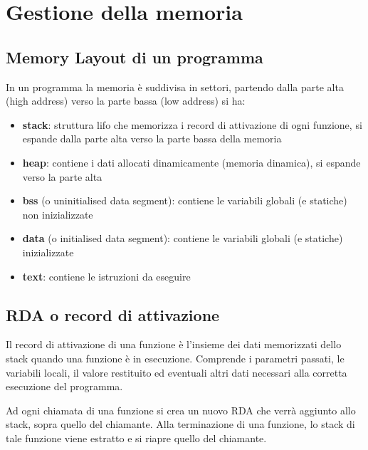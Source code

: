 \documentclass[a4paper]{article}
\begin{document}
\newpage

\section{Gestione della memoria}
\subsection{Memory Layout di un programma}
In un programma la memoria è suddivisa in settori, partendo dalla parte alta (high address) verso la parte bassa (low address) si ha:
\begin{itemize}
	\item \textbf{stack}: struttura lifo che memorizza i record di attivazione di ogni funzione, si espande dalla parte alta
	verso la parte bassa della memoria
	\item \textbf{heap}: contiene i dati allocati dinamicamente (memoria dinamica), si espande verso la parte alta
	\item \textbf{bss} (o uninitialised data segment): contiene le variabili globali (e statiche) non inizializzate
	\item \textbf{data} (o initialised data segment): contiene le variabili globali (e statiche) inizializzate
	\item \textbf{text}: contiene le istruzioni da eseguire
\end{itemize}

\subsection{RDA o record di attivazione}
Il record di attivazione di una funzione è l'insieme dei dati memorizzati dello stack quando una funzione è in esecuzione.
Comprende i parametri passati, le variabili locali, il valore restituito ed eventuali altri dati necessari alla corretta
esecuzione del programma.

Ad ogni chiamata di una funzione si crea un nuovo RDA che verrà aggiunto allo stack, sopra quello
del chiamante. Alla terminazione di una funzione, lo stack di tale funzione viene estratto e si riapre quello del chiamante.
\end{document}
